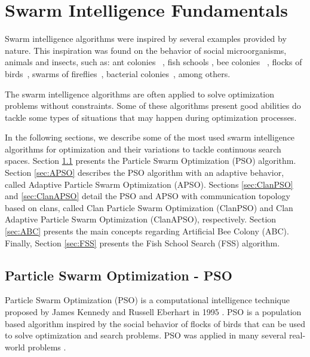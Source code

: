 \chapter{Swarm Intelligence Fundamentals}\label{cap:Swarm}
Swarm intelligence algorithms were inspired by several examples provided by nature. This inspiration was found on the behavior of social microorganisms, animals and insects, such as: ant colonies~\cite{ACO:Dorigo1999}\cite{ACO:Dorigo2005}\cite{ACS:Dorigo} \cite{MMAS:Kovarik}, fish schools \cite{FSS:Bastos-Filho2008}\cite{FSA:Yazdani2012}, bee colonies~\cite{ABC:Karaboga2005}\cite{BCO:Teodorovic2005}\cite{BCO:Teodorovic2006}\cite{BSO:Akbari2009}\cite{BSO:Akbari2010}\cite{BA:Pham2005}    \cite{BA:Pham2007}, flocks of birds~\cite{PSO:Eberhart1995}, swarms of fireflies~\cite{GSO:Krishnanand2009}\cite{FA:Yang2009}, bacterial colonies~\cite{BFO:Das2009}\cite{BFA:Muller2002}, among others.

The swarm intelligence algorithms are often applied to solve optimization problems without constraints. Some of these algorithms present good abilities do tackle some types of situations that may happen during optimization processes.

In the following sections, we describe some of the most used swarm intelligence algorithms for optimization and their variations to tackle continuous search spaces. Section \ref{sec:PSO} presents the Particle Swarm Optimization (PSO) algorithm. Section \ref{sec:APSO} describes the PSO algorithm with an adaptive behavior, called Adaptive Particle Swarm Optimization (APSO). Sections \ref{sec:ClanPSO} and \ref{sec:ClanAPSO} detail the PSO and APSO with communication topology based on clans, called Clan Particle Swarm Optimization (ClanPSO) and Clan Adaptive Particle Swarm Optimization (ClanAPSO), respectively. Section \ref{sec:ABC} presents the main concepts regarding Artificial Bee Colony (ABC). Finally, Section \ref{sec:FSS} presents the Fish School Search (FSS) algorithm.

\section{Particle Swarm Optimization - PSO}\label{sec:PSO}
Particle Swarm Optimization (PSO) is a computational intelligence technique proposed by James Kennedy and Russell Eberhart in 1995 \cite{PSO:Kennedy} \cite{PSO:Eberhart1995}\cite{PSO:Eberhart1995a} \cite{PSO:Schoene}. PSO is a population based algorithm inspired by the social behavior of flocks of birds that can be used to solve optimization and search problems. PSO was applied in many several real-world problems \cite{PSO:Wachowiak2004} \cite{PSO:Lu2002} \cite{PSO:Lian2006}.


